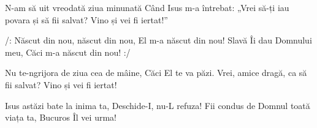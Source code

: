 \beginverse
N-am să uit vreodată ziua minunată
Când Isus m-a întrebat:
„Vrei să-ți iau povara și să fii salvat?
Vino și vei fi iertat!”
\endverse

\beginchorus
/: Născut din nou, născut din nou,
El m-a născut din nou!
Slavă Îi dau Domnului meu,
Căci m-a născut din nou! :/
\endchorus

\beginverse
Nu te-ngrijora de ziua cea de mâine,
Căci El te va păzi.
Vrei, amice dragă, ca să fii salvat?
Vino și vei fi iertat!
\endverse

\beginverse
Isus astăzi bate la inima ta,
Deschide-I, nu-L refuza!
Fii condus de Domnul toată viața ta,
Bucuros Îl vei urma!
\endverse
\endsong